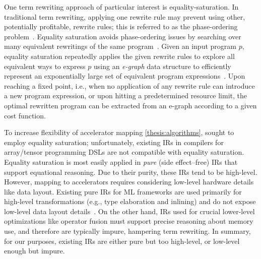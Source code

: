 One term rewriting approach
  of particular interest
  is \gls{equality-saturation}.
In traditional term rewriting,
  applying one rewrite rule
  may prevent
  using other, potentially profitable, rewrite rules;
  this is referred to as the phase-ordering problem~\cite{whitfield1997approach}.
Equality saturation avoids
  phase-ordering issues %
  by searching over many equivalent rewritings of the same program~\cite{tate2011equality,joshi2002denali}.
Given an input program $p$, 
  equality saturation repeatedly applies 
  the given rewrite rules 
  to explore all equivalent ways to express $p$
using an \textit{e-graph} data structure
  to efficiently represent an exponentially large set of equivalent program expressions~\cite{nelson1980fast,nieuwenhuis2005proof}.
Upon reaching a fixed point, 
  i.e., when no application of any rewrite rule can introduce a new program expression,
  or upon hitting a predetermined resource limit,
  the optimal rewritten program
  can be extracted from an e-graph
  according to a given cost function.

To increase flexibility
  of accelerator mapping \cref{thesis:algorithms},
  {\TLA} sought to employ equality saturation;
  unfortunately, existing IRs in compilers for
  array/tensor programming DSLs 
  are not compatible with equality saturation.
Equality saturation is most easily applied in
  \textit{pure} (side effect--free) IRs
  that support equational reasoning.
Due to their purity, these IRs tend to be
  high-level.
However,
  mapping to accelerators requires considering
  low-level hardware details like data layout.
Existing pure IRs for ML frameworks are used
  primarily for high-level transformations
  (e.g., type elaboration and inlining)
  and do not expose low-level data layout details~\cite{relay}.
On the other hand,
  IRs used for crucial lower-level optimizations like
  operator fusion must support
  precise reasoning about memory use,
  and therefore are typically impure,
  hampering term rewriting.
In summary, for our purposes,
  existing IRs are either pure but too high-level,
  or low-level enough but impure.

